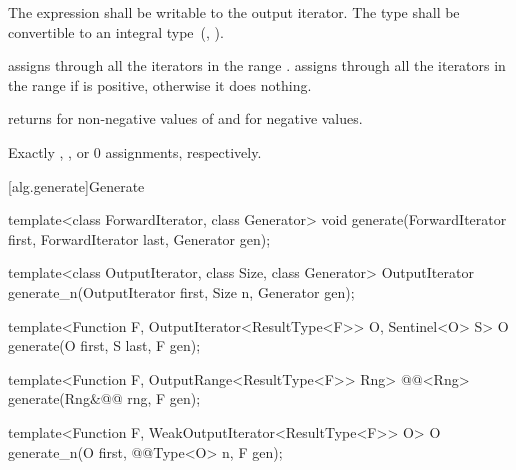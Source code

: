 \begin{itemdescr}
\begin{removedblock}
\pnum
\requires
The expression
shall be writable to the output iterator. The type
shall be convertible to an integral type~(, ).
\end{removedblock}

\pnum
\effects
{} assigns  through all the
iterators in the range . 
assigns  through all the iterators in the range 
if  is positive, otherwise it does nothing.

\pnum
\returns {} returns 
for non-negative values of  and  for negative values.

\pnum
\complexity
Exactly
,
, or 0 assignments, respectively.
\end{itemdescr}

[alg.generate]{Generate}

%
%
\begin{removedblock}
\begin{itemdecl}
template<class ForwardIterator, class Generator>
  void generate(ForwardIterator first, ForwardIterator last,
                Generator gen);

template<class OutputIterator, class Size, class Generator>
  OutputIterator generate_n(OutputIterator first, Size n, Generator gen);
\end{itemdecl}
\end{removedblock}
\begin{addedblock}
\begin{itemdecl}
template<Function F, OutputIterator<ResultType<F>> O,
    Sentinel<O> S>
  O generate(O first, S last, F gen);

template<Function F, OutputRange<ResultType<F>> Rng>
  @@<Rng>
    generate(Rng&@\newtxt{\&}@ rng, F gen);

template<Function F, WeakOutputIterator<ResultType<F>> O>
  O generate_n(O first, @@Type<O> n, F gen);
\end{itemdecl}
\end{addedblock}

